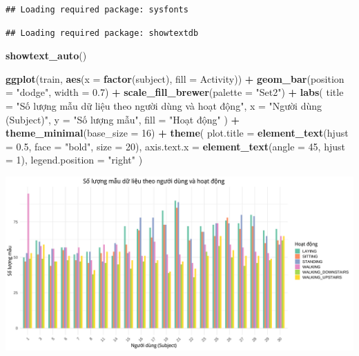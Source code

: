\documentclass[
]{article}
\newenvironment{Shaded}{\begin{snugshade}}{\end{snugshade}}
\newcommand{\AttributeTok}[1]{\textcolor[rgb]{0.13,0.29,0.53}{#1}}
\newcommand{\DecValTok}[1]{\textcolor[rgb]{0.00,0.00,0.81}{#1}}
\newcommand{\FloatTok}[1]{\textcolor[rgb]{0.00,0.00,0.81}{#1}}
\newcommand{\FunctionTok}[1]{\textcolor[rgb]{0.13,0.29,0.53}{\textbf{#1}}}
\newcommand{\NormalTok}[1]{#1}
\newcommand{\SpecialCharTok}[1]{\textcolor[rgb]{0.81,0.36,0.00}{\textbf{#1}}}
\newcommand{\StringTok}[1]{\textcolor[rgb]{0.31,0.60,0.02}{#1}}
\begin{document}
\begin{verbatim}
## Loading required package: sysfonts
\end{verbatim}

\begin{verbatim}
## Loading required package: showtextdb
\end{verbatim}

\begin{Shaded}
\begin{Highlighting}[]
\FunctionTok{showtext\_auto}\NormalTok{()}

\FunctionTok{ggplot}\NormalTok{(train, }\FunctionTok{aes}\NormalTok{(}\AttributeTok{x =} \FunctionTok{factor}\NormalTok{(subject), }\AttributeTok{fill =}\NormalTok{ Activity)) }\SpecialCharTok{+}
  \FunctionTok{geom\_bar}\NormalTok{(}\AttributeTok{position =} \StringTok{"dodge"}\NormalTok{, }\AttributeTok{width =} \FloatTok{0.7}\NormalTok{) }\SpecialCharTok{+}
  \FunctionTok{scale\_fill\_brewer}\NormalTok{(}\AttributeTok{palette =} \StringTok{"Set2"}\NormalTok{) }\SpecialCharTok{+} 
  \FunctionTok{labs}\NormalTok{(}
    \AttributeTok{title =} \StringTok{"Số lượng mẫu dữ liệu theo người dùng và hoạt động"}\NormalTok{,}
    \AttributeTok{x =} \StringTok{"Người dùng (Subject)"}\NormalTok{,}
    \AttributeTok{y =} \StringTok{"Số lượng mẫu"}\NormalTok{,}
    \AttributeTok{fill =} \StringTok{"Hoạt động"}
\NormalTok{  ) }\SpecialCharTok{+}
  \FunctionTok{theme\_minimal}\NormalTok{(}\AttributeTok{base\_size =} \DecValTok{16}\NormalTok{) }\SpecialCharTok{+}
  \FunctionTok{theme}\NormalTok{(}
    \AttributeTok{plot.title =} \FunctionTok{element\_text}\NormalTok{(}\AttributeTok{hjust =} \FloatTok{0.5}\NormalTok{, }\AttributeTok{face =} \StringTok{"bold"}\NormalTok{, }\AttributeTok{size =} \DecValTok{20}\NormalTok{),}
    \AttributeTok{axis.text.x =} \FunctionTok{element\_text}\NormalTok{(}\AttributeTok{angle =} \DecValTok{45}\NormalTok{, }\AttributeTok{hjust =} \DecValTok{1}\NormalTok{),}
    \AttributeTok{legend.position =} \StringTok{"right"}
\NormalTok{  )}
\end{Highlighting}
\end{Shaded}

\includegraphics{report_files/figure-latex/unnamed-chunk-6-1.pdf}
\end{document}

